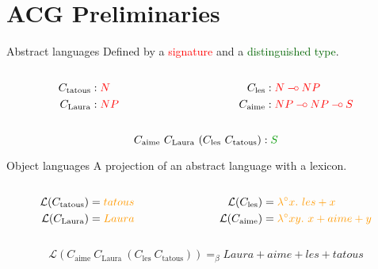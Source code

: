 \documentclass{beamer}
\def\limp {\mathbin{{-}\mkern-3.5mu{\circ}}}
\begin{document}
\section{ACG Preliminaries}


\newcommand{\synt}[1]{C_{\textrm{#1}}}

\begin{frame}
  \begin{block}{Abstract languages}
    Defined by a \textcolor{red}{signature} and a
    \textcolor{darkgreen}{distinguished type}.

    \begin{columns}[t]
      \begin{column}{0.5\textwidth}
        \begin{align*}
          \synt{tatous} &: \textcolor{red}{N} \\
          \synt{Laura} &: \textcolor{red}{NP}
        \end{align*}
      \end{column}
      \begin{column}{0.5\textwidth}
        \begin{align*}
          \synt{les} &: \textcolor{red}{N \limp NP} \\
          \synt{aime} &: \textcolor{red}{NP \limp NP \limp S}
        \end{align*}
      \end{column}
    \end{columns}

    $$\synt{aime}\ \synt{Laura}\ (\synt{les}\ \synt{tatous}) :
    \textcolor{darkgreen}{S}$$
  \end{block}

  \begin{block}{Object languages}
    A projection of an abstract language with a \textcolor{darkgold}{lexicon}.

    \begin{columns}[t]
      \begin{column}{0.5\textwidth}
        \begin{align*}
          \mathcal{L}(\synt{tatous}) &= \textcolor{darkgold}{tatous} \\
          \mathcal{L}(\synt{Laura}) &= \textcolor{darkgold}{Laura}
        \end{align*}
      \end{column}
      \begin{column}{0.5\textwidth}
        \begin{align*}
          \mathcal{L}(\synt{les}) &= \textcolor{darkgold}{\lambda^{\circ} x.\ les + x} \\
          \mathcal{L}(\synt{aime}) &= \textcolor{darkgold}{\lambda^{\circ} x y.\ x + aime + y}
        \end{align*}
      \end{column}
    \end{columns}

    $$\mathcal{L}(\synt{aime}\ \synt{Laura}\ (\synt{les}\ \synt{tatous}))
    =_{\beta} Laura + aime + les + tatous$$
  \end{block}
\end{frame}
\end{document}
